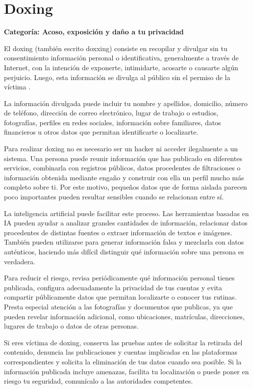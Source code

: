 \documentclass[
  spanish,
  a4paper,
  openany]{book}
\begin{document}
\section{Doxing}\label{doxing}

\textbf{Categoría: Acoso, exposición y daño a tu privacidad}

El doxing (también escrito doxxing) consiste en recopilar y divulgar sin tu consentimiento información personal o identificativa, generalmente a través de Internet, con la intención de exponerte, intimidarte, acosarte o causarte algún perjuicio. Luego, esta información se divulga al público sin el permiso de la víctima \citep{KASPER-doxing}.

La información divulgada puede incluir tu nombre y apellidos, domicilio, número de teléfono, dirección de correo electrónico, lugar de trabajo o estudios, fotografías, perfiles en redes sociales, información sobre familiares, datos financieros u otros datos que permitan identificarte o localizarte.

Para realizar doxing no es necesario ser un hacker ni acceder ilegalmente a un sistema. Una persona puede reunir información que has publicado en diferentes servicios, combinarla con registros públicos, datos procedentes de filtraciones o información obtenida mediante engaño y construir con ella un perfil mucho más completo sobre ti. Por este motivo, pequeños datos que de forma aislada parecen poco importantes pueden resultar sensibles cuando se relacionan entre sí.

La inteligencia artificial puede facilitar este proceso. Las herramientas basadas en IA pueden ayudar a analizar grandes cantidades de información, relacionar datos procedentes de distintas fuentes o extraer información de textos e imágenes. También pueden utilizarse para generar información falsa y mezclarla con datos auténticos, haciendo más difícil distinguir qué información sobre una persona es verdadera.

Para reducir el riesgo, revisa periódicamente qué información personal tienes publicada, configura adecuadamente la privacidad de tus cuentas y evita compartir públicamente datos que permitan localizarte o conocer tus rutinas. Presta especial atención a las fotografías y documentos que publicas, ya que pueden revelar información adicional, como ubicaciones, matrículas, direcciones, lugares de trabajo o datos de otras personas.

Si eres víctima de doxing, conserva las pruebas antes de solicitar la retirada del contenido, denuncia las publicaciones y cuentas implicadas en las plataformas correspondientes y solicita la eliminación de tus datos cuando sea posible. Si la información publicada incluye amenazas, facilita tu localización o puede poner en riesgo tu seguridad, comunícalo a las autoridades competentes.
\end{document}
